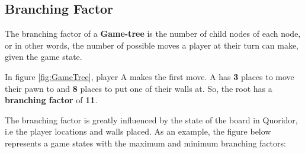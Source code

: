 \subsection{Branching Factor}
\label{BranchingFactor}

The branching factor of a \textbf{Game-tree} is the number of child nodes of each node, or in other words, the number of possible moves a player at their turn can make, given the game state.

In figure \ref{fig:GameTree}, player A makes the first move. A has \textbf{3} places to move their pawn to and \textbf{8} places to put one of their walls at. So, the root has a \textbf{branching factor} of \textbf{11}.
\par
The branching factor is greatly influenced by the state of the board in Quoridor, i.e the player locations and walls placed.
\newline
\newline
As an example, the figure below represents a game states with the maximum and minimum branching factors:

